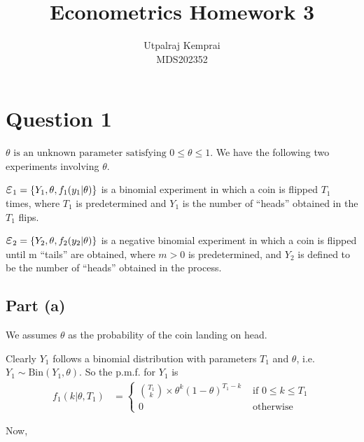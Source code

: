 \documentclass[a4paper]{article}
\begin{document}
\title{\huge Econometrics Homework 3}
\author{\LARGE Utpalraj Kemprai \\[5pt]
\LARGE MDS202352}
\date{}

\begin{titlingpage}
    \maketitle
\end{titlingpage}

\newpage

\section*{Question 1}

\(\displaystyle \theta \text{ is an unknown parameter satisfying } 0 \leq \theta \leq 1\). We have the following two experiments involving $\theta$.

\(\displaystyle \scalebox{1.5}{\ensuremath{\varepsilon}}_1 = \{Y_1, \theta, f_1 (y_1|\theta)\} \) is a binomial experiment in which a coin is flipped $T_1$ times, where $T_1$ is predetermined and $Y_1$ is the number of ``heads'' obtained in the $T_1$ flips.

\(\displaystyle \scalebox{1.5}{\ensuremath{\varepsilon}}_2 = \{Y_2, \theta, f_2 (y_2|\theta)\}\) is a negative binomial experiment in which a coin is flipped until m ``tails'' are obtained, where $m > 0$ is predetermined, and $Y_2$ is defined to be the number of ``heads'' obtained in the process.

\subsection*{Part (a)}

\noindent We assumes $\theta$ as the probability of the coin landing on head.

\noindent Clearly $Y_1$ follows a binomial distribution with parameters $T_1$ and $\theta$, i.e. $Y_1 \sim \text{Bin}(Y_1, \theta)$. So the p.m.f. for $Y_1$ is
\begin{align*}
    f_1(k|\theta,T_1) &= \begin{cases}
    \binom{T_1}{k} \times \theta^k (1 - \theta)^{T_1 - k} & \text{ if } 0 \leq k \leq T_1\\
    0 & \text{ otherwise }
        \end{cases}
\end{align*}

\noindent Now,
\end{document}
